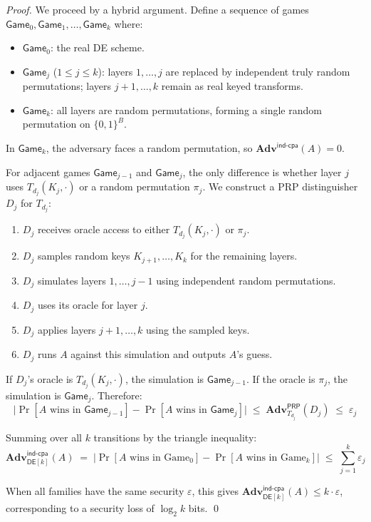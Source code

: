 \documentclass[11pt]{article}
\newcommand{\DE}{\textsf{DE}}
\newcommand{\PRP}{\textsf{PRP}}
\newcommand{\Adv}{\mathbf{Adv}}
\begin{document}
\begin{proof}
We proceed by a hybrid argument. Define a sequence of games
$\textsf{Game}_0, \textsf{Game}_1, \ldots, \textsf{Game}_k$ where:

\begin{itemize}
\item $\textsf{Game}_0$: the real \DE{} scheme.
\item $\textsf{Game}_j$ ($1 \leq j \leq k$): layers $1, \ldots, j$ are
replaced by independent truly random permutations; layers $j+1, \ldots, k$
remain as real keyed transforms.
\item $\textsf{Game}_k$: all layers are random permutations, forming a
single random permutation on $\{0,1\}^B$.
\end{itemize}

In $\textsf{Game}_k$, the adversary faces a random permutation, so
$\Adv^{\textsf{ind-cpa}}(A) = 0$.

For adjacent games $\textsf{Game}_{j-1}$ and $\textsf{Game}_j$, the only
difference is whether layer $j$ uses $T_{d_j}(K_j, \cdot)$ or a random
permutation $\pi_j$. We construct a PRP distinguisher $D_j$ for $T_{d_j}$:

\begin{enumerate}
\item $D_j$ receives oracle access to either $T_{d_j}(K_j, \cdot)$ or $\pi_j$.
\item $D_j$ samples random keys $K_{j+1}, \ldots, K_k$ for the remaining layers.
\item $D_j$ simulates layers $1, \ldots, j-1$ using independent random permutations.
\item $D_j$ uses its oracle for layer $j$.
\item $D_j$ applies layers $j+1, \ldots, k$ using the sampled keys.
\item $D_j$ runs $A$ against this simulation and outputs $A$'s guess.
\end{enumerate}

If $D_j$'s oracle is $T_{d_j}(K_j, \cdot)$, the simulation is
$\textsf{Game}_{j-1}$. If the oracle is $\pi_j$, the simulation is
$\textsf{Game}_j$. Therefore:
\[
\bigl|\Pr[A \text{ wins in } \textsf{Game}_{j-1}] - \Pr[A \text{ wins in } \textsf{Game}_j]\bigr|
\;\leq\; \Adv^{\PRP}_{T_{d_j}}(D_j) \;\leq\; \varepsilon_j
\]

Summing over all $k$ transitions by the triangle inequality:
\[
\Adv^{\textsf{ind-cpa}}_{\DE[k]}(A)
\;=\; \bigl|\Pr[A \text{ wins in Game}_0] - \Pr[A \text{ wins in Game}_k]\bigr|
\;\leq\; \sum_{j=1}^{k} \varepsilon_j
\]

When all families have the same security $\varepsilon$, this gives
$\Adv^{\textsf{ind-cpa}}_{\DE[k]}(A) \leq k \cdot \varepsilon$,
corresponding to a security loss of $\log_2 k$ bits. \qed
\end{proof}
\end{document}
